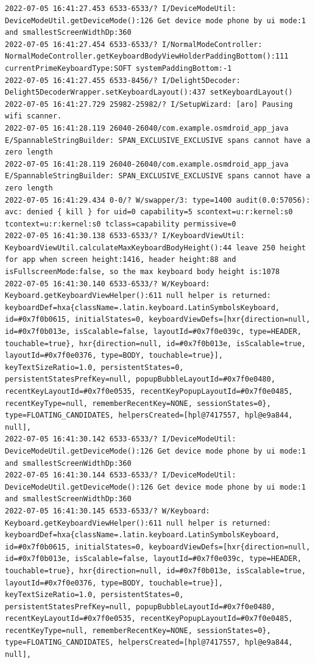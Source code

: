\documentclass[a4paper,12pt]{book}
\begin{document}
\begin{lstlisting}
2022-07-05 16:41:27.453 6533-6533/? I/DeviceModeUtil: DeviceModeUtil.getDeviceMode():126 Get device mode phone by ui mode:1 and smallestScreenWidthDp:360
2022-07-05 16:41:27.454 6533-6533/? I/NormalModeController: NormalModeController.getKeyboardBodyViewHolderPaddingBottom():111 currentPrimeKeyboardType:SOFT systemPaddingBottom:-1
2022-07-05 16:41:27.455 6533-8456/? I/Delight5Decoder: Delight5DecoderWrapper.setKeyboardLayout():437 setKeyboardLayout()
2022-07-05 16:41:27.729 25982-25982/? I/SetupWizard: [aro] Pausing wifi scanner.
2022-07-05 16:41:28.119 26040-26040/com.example.osmdroid_app_java E/SpannableStringBuilder: SPAN_EXCLUSIVE_EXCLUSIVE spans cannot have a zero length
2022-07-05 16:41:28.119 26040-26040/com.example.osmdroid_app_java E/SpannableStringBuilder: SPAN_EXCLUSIVE_EXCLUSIVE spans cannot have a zero length
2022-07-05 16:41:29.434 0-0/? W/swapper/3: type=1400 audit(0.0:57056): avc: denied { kill } for uid=0 capability=5 scontext=u:r:kernel:s0 tcontext=u:r:kernel:s0 tclass=capability permissive=0
2022-07-05 16:41:30.138 6533-6533/? I/KeyboardViewUtil: KeyboardViewUtil.calculateMaxKeyboardBodyHeight():44 leave 250 height for app when screen height:1416, header height:88 and isFullscreenMode:false, so the max keyboard body height is:1078
2022-07-05 16:41:30.140 6533-6533/? W/Keyboard: Keyboard.getKeyboardViewHelper():611 null helper is returned: keyboardDef=hxa{className=.latin.keyboard.LatinSymbolsKeyboard, id=#0x7f0b0615, initialStates=0, keyboardViewDefs=[hxr{direction=null, id=#0x7f0b013e, isScalable=false, layoutId=#0x7f0e039c, type=HEADER, touchable=true}, hxr{direction=null, id=#0x7f0b013e, isScalable=true, layoutId=#0x7f0e0376, type=BODY, touchable=true}], keyTextSizeRatio=1.0, persistentStates=0, persistentStatesPrefKey=null, popupBubbleLayoutId=#0x7f0e0480, recentKeyLayoutId=#0x7f0e0535, recentKeyPopupLayoutId=#0x7f0e0485, recentKeyType=null, rememberRecentKey=NONE, sessionStates=0}, type=FLOATING_CANDIDATES, helpersCreated=[hpl@7417557, hpl@e9a844, null], 
2022-07-05 16:41:30.142 6533-6533/? I/DeviceModeUtil: DeviceModeUtil.getDeviceMode():126 Get device mode phone by ui mode:1 and smallestScreenWidthDp:360
2022-07-05 16:41:30.144 6533-6533/? I/DeviceModeUtil: DeviceModeUtil.getDeviceMode():126 Get device mode phone by ui mode:1 and smallestScreenWidthDp:360
2022-07-05 16:41:30.145 6533-6533/? W/Keyboard: Keyboard.getKeyboardViewHelper():611 null helper is returned: keyboardDef=hxa{className=.latin.keyboard.LatinSymbolsKeyboard, id=#0x7f0b0615, initialStates=0, keyboardViewDefs=[hxr{direction=null, id=#0x7f0b013e, isScalable=false, layoutId=#0x7f0e039c, type=HEADER, touchable=true}, hxr{direction=null, id=#0x7f0b013e, isScalable=true, layoutId=#0x7f0e0376, type=BODY, touchable=true}], keyTextSizeRatio=1.0, persistentStates=0, persistentStatesPrefKey=null, popupBubbleLayoutId=#0x7f0e0480, recentKeyLayoutId=#0x7f0e0535, recentKeyPopupLayoutId=#0x7f0e0485, recentKeyType=null, rememberRecentKey=NONE, sessionStates=0}, type=FLOATING_CANDIDATES, helpersCreated=[hpl@7417557, hpl@e9a844, null], 

\end{lstlisting}
\end{document}
